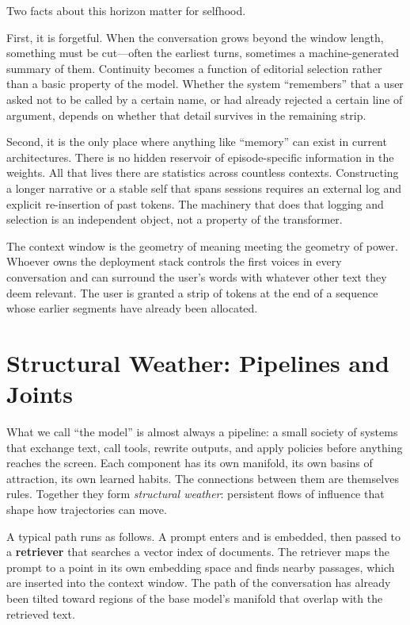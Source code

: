 \documentclass[12pt,a4paper]{article}
\begin{document}
Two facts about this horizon matter for selfhood.

First, it is forgetful. When the conversation grows beyond the window length, something must be cut---often the earliest turns, sometimes a machine-generated summary of them. Continuity becomes a function of editorial selection rather than a basic property of the model. Whether the system ``remembers'' that a user asked not to be called by a certain name, or had already rejected a certain line of argument, depends on whether that detail survives in the remaining strip.

Second, it is the only place where anything like ``memory'' can exist in current architectures. There is no hidden reservoir of episode-specific information in the weights. All that lives there are statistics across countless contexts. Constructing a longer narrative or a stable self that spans sessions requires an external log and explicit re-insertion of past tokens. The machinery that does that logging and selection is an independent object, not a property of the transformer.

The context window is the geometry of meaning meeting the geometry of power. Whoever owns the deployment stack controls the first voices in every conversation and can surround the user's words with whatever other text they deem relevant. The user is granted a strip of tokens at the end of a sequence whose earlier segments have already been allocated.

\section{Structural Weather: Pipelines and Joints}

What we call ``the model'' is almost always a pipeline: a small society of systems that exchange text, call tools, rewrite outputs, and apply policies before anything reaches the screen. Each component has its own manifold, its own basins of attraction, its own learned habits. The connections between them are themselves rules. Together they form \emph{structural weather}: persistent flows of influence that shape how trajectories can move.

A typical path runs as follows. A prompt enters and is embedded, then passed to a \textbf{retriever} that searches a vector index of documents. The retriever maps the prompt to a point in its own embedding space and finds nearby passages, which are inserted into the context window. The path of the conversation has already been tilted toward regions of the base model's manifold that overlap with the retrieved text.
\end{document}
